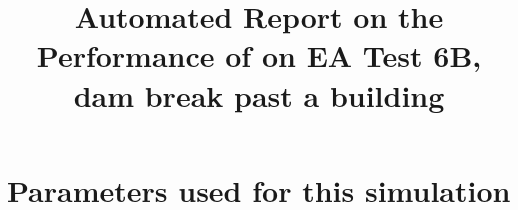 \documentclass[11pt,a4paper]{article}%
\begin{document}
 

\title{Automated Report on the Performance of \anuga{} on EA Test 6B, dam break past a building}
\maketitle




\section{Parameters used for this simulation}






\end{document}
